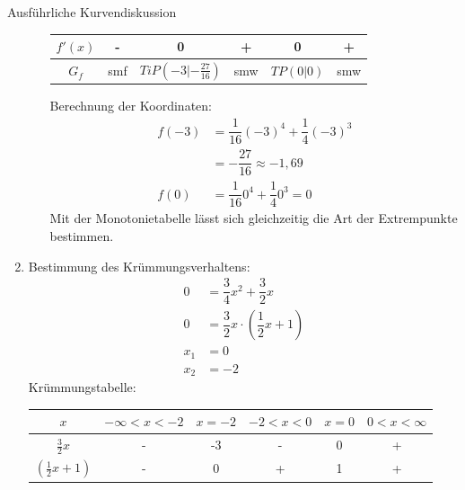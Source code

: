 \begin{bsp}{Ausführliche Kurvendiskussion}{}
\begin{enumerate}
\begin{itemize}
\begin{center}
\begin{tabular}{||c|c|c|c|c|c||}
    $f'(x)$ & - & 0 & + & 0 & +\\ 
    \hline
    \hline
    $G_f$ & smf & $TiP(-3|-\frac{27}{16})$ & smw  & $TP(0|0) $& smw\\
    \hline
\end{tabular}
\end{center}
Berechnung der Koordinaten:
           \begin{equation*}
        \begin{split}
         f(-3)&= \dfrac{1}{16} (-3)^4 +\dfrac{1}{4} (-3)^3\\
         &= -\dfrac{27}{16}\approx -1,69\\
         f(0) &= \dfrac{1}{16} 0^4 +\dfrac{1}{4} 0^3 = 0
        \end{split}
\end{equation*}
Mit der Monotonietabelle lässt sich gleichzeitig die Art der Extrempunkte bestimmen.
    \end{itemize}
    \item Bestimmung des Krümmungsverhaltens:
 \begin{equation*}
        \begin{split}
         0 &= \dfrac{3}{4} x^2 +\dfrac{3}{2} x\\
         0 &= \dfrac{3}{2} x \cdot (\dfrac{1}{2}x + 1)\\
         x_1 &= 0\\
         x_2&= -2
        \end{split}
\end{equation*}
Krümmungstabelle:
\begin{center}
    \setlength{\tabcolsep}{4pt}

\begin{tabular}{||c|c|c|c|c|c||}
    \hline
    $x$ & $ -\infty <x<-2 $ & $ x = -2$ &$ -2<x<0 $ & $x=0 $& $ 0<x<\infty $\\
    \hline \hline
    $\frac{3}{2} x$ & - &  -3 & - & 0 & +  \\
    \hline
    $(\frac{1}{2} x +1)$ & - & 0 & + & 1 & + \\
    \hline


\end{tabular}
\end{center}
\end{enumerate}
\end{bsp}
